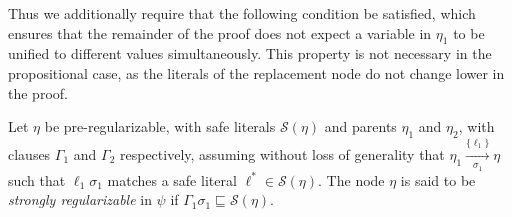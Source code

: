 
\noindent
Thus we additionally require that the following condition be satisfied, which ensures that the remainder of the proof does not expect a variable in $\eta_1$ to be unified to different values simultaneously. This property is not necessary in the propositional case, as the literals of the replacement node do not change lower in the proof. 


\begin{definition} %
\label{prop:extracheck}
Let $\eta$ be pre-regularizable, with safe literals $\mathcal{S}(\eta)$ and parents $\eta_1$ and $\eta_2$, with clauses $\Gamma_1$ and $\Gamma_2$ respectively, assuming without loss of generality that $\eta_1 \xrightarrow[\sigma_1]{\{\ell_1\} } \eta$
such that $\ell_1\sigma_1$ matches a safe literal $\ell^*\in \mathcal{S}(\eta)$. 
The node $\eta$ is said to be \emph{strongly regularizable} in $\psi$ if $\Gamma_1 \sigma_{1} \sqsubseteq \mathcal{S}(\eta)$.
\end{definition}


